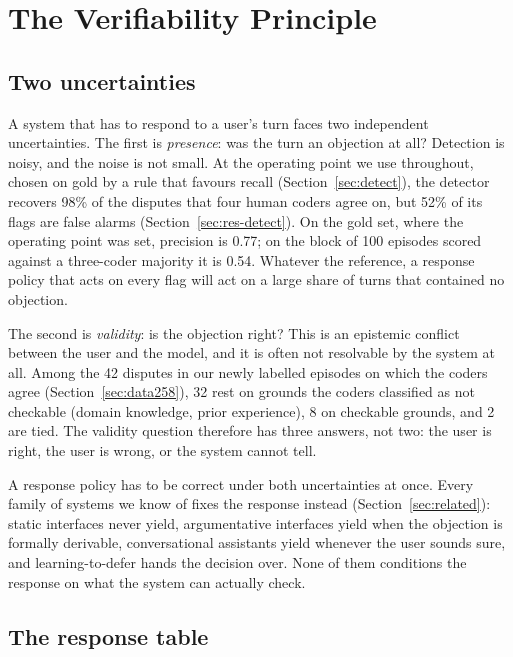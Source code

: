 \documentclass[preprint,12pt,3p,times]{elsarticle}
\begin{document}
\section{The Verifiability Principle}
\label{sec:principle}

\subsection{Two uncertainties}
\label{sec:uncertainties}

A system that has to respond to a user's turn faces two independent uncertainties. The first is \emph{presence}: was the turn an objection at all? Detection is noisy, and the noise is not small. At the operating point we use throughout, chosen on gold by a rule that favours recall (Section~\ref{sec:detect}), the detector recovers 98\% of the disputes that four human coders agree on, but 52\% of its flags are false alarms (Section~\ref{sec:res-detect}). On the gold set, where the operating point was set, precision is 0.77; on the block of 100 episodes scored against a three-coder majority it is 0.54. Whatever the reference, a response policy that acts on every flag will act on a large share of turns that contained no objection.

The second is \emph{validity}: is the objection right? This is an epistemic conflict between the user and the model, and it is often not resolvable by the system at all. Among the 42 disputes in our newly labelled episodes on which the coders agree (Section~\ref{sec:data258}), 32 rest on grounds the coders classified as not checkable (domain knowledge, prior experience), 8 on checkable grounds, and 2 are tied. The validity question therefore has three answers, not two: the user is right, the user is wrong, or the system cannot tell.

A response policy has to be correct under both uncertainties at once. Every family of systems we know of fixes the response instead (Section~\ref{sec:related}): static interfaces never yield, argumentative interfaces yield when the objection is formally derivable, conversational assistants yield whenever the user sounds sure, and learning-to-defer hands the decision over. None of them conditions the response on what the system can actually check.

\subsection{The response table}
\label{sec:table}
\end{document}
